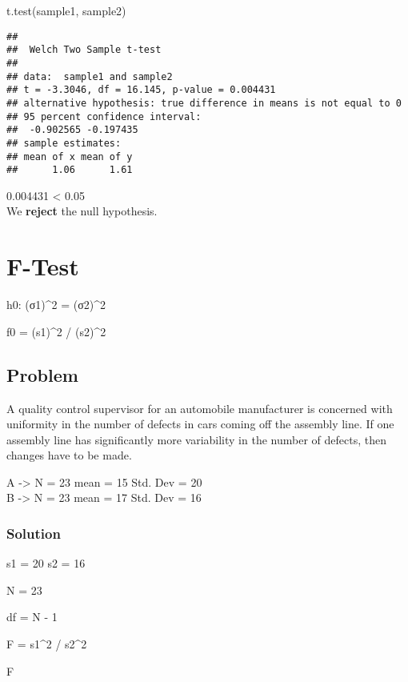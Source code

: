 \documentclass[
]{article}
\newenvironment{Shaded}{\begin{snugshade}}{\end{snugshade}}
\newcommand{\DecValTok}[1]{\textcolor[rgb]{0.00,0.00,0.81}{#1}}
\newcommand{\FunctionTok}[1]{\textcolor[rgb]{0.00,0.00,0.00}{#1}}
\newcommand{\NormalTok}[1]{#1}
\newcommand{\OtherTok}[1]{\textcolor[rgb]{0.56,0.35,0.01}{#1}}
\newcommand{\SpecialCharTok}[1]{\textcolor[rgb]{0.00,0.00,0.00}{#1}}
\begin{document}
\begin{Shaded}
\begin{Highlighting}[]
\FunctionTok{t.test}\NormalTok{(sample1, sample2)}
\end{Highlighting}
\end{Shaded}

\begin{verbatim}
## 
##  Welch Two Sample t-test
## 
## data:  sample1 and sample2
## t = -3.3046, df = 16.145, p-value = 0.004431
## alternative hypothesis: true difference in means is not equal to 0
## 95 percent confidence interval:
##  -0.902565 -0.197435
## sample estimates:
## mean of x mean of y 
##      1.06      1.61
\end{verbatim}

0.004431 \textless{} 0.05\\
We \textbf{reject} the null hypothesis.

\hypertarget{f-test}{%
\section{F-Test}\label{f-test}}

h0: (σ1)\^{}2 = (σ2)\^{}2

f0 = (s1)\^{}2 / (s2)\^{}2

\hypertarget{problem-20}{%
\subsection{Problem}\label{problem-20}}

A quality control supervisor for an automobile manufacturer is concerned
with uniformity in the number of defects in cars coming off the assembly
line. If one assembly line has significantly more variability in the
number of defects, then changes have to be made.

A -\textgreater{} N = 23 mean = 15 Std. Dev = 20\\
B -\textgreater{} N = 23 mean = 17 Std. Dev = 16

\hypertarget{solution-21}{%
\subsubsection{Solution}\label{solution-21}}

\begin{Shaded}
\begin{Highlighting}[]
\NormalTok{s1 }\OtherTok{=} \DecValTok{20}
\NormalTok{s2 }\OtherTok{=} \DecValTok{16}

\NormalTok{N }\OtherTok{=} \DecValTok{23}

\NormalTok{df }\OtherTok{=}\NormalTok{ N }\SpecialCharTok{{-}} \DecValTok{1}

\NormalTok{F }\OtherTok{=}\NormalTok{ s1}\SpecialCharTok{\^{}}\DecValTok{2} \SpecialCharTok{/}\NormalTok{ s2}\SpecialCharTok{\^{}}\DecValTok{2}

\NormalTok{F}
\end{Highlighting}
\end{Shaded}
\end{document}
